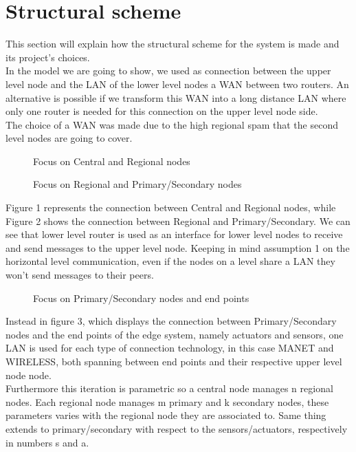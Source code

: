 \documentclass[11pt]{article}
\begin{document}
\section{Structural scheme}
This section will explain how the structural scheme for the system is made and its project's choices.\\
In the model we are going to show, we used as connection between the upper level node and the LAN of the lower level nodes a WAN between two routers. An alternative is possible if we transform this WAN into a long distance LAN where only one router is needed for this connection on the upper level node side.\\
The choice of a WAN was made due to the high regional spam that the second level nodes are going to cover.
\begin{figure}[H]
	\hspace*{-3.75cm}
	\centering
  \frame{}
  \caption{Focus on Central and Regional nodes}
\end{figure}
\begin{figure}[H]
	\hspace*{-3.75cm}
	\frame{}
	\caption{Focus on Regional and Primary/Secondary nodes}
\end{figure}
Figure 1 represents the connection between Central and Regional nodes, while Figure 2 shows the connection between Regional and Primary/Secondary. We can  see that lower level router is used as an interface for lower level nodes to receive and send messages to the upper level node. Keeping in mind assumption 1 on the horizontal level communication, even if the nodes on a level share a LAN they won't send messages to their peers.\\
\begin{figure}[H]
	\hspace*{-3.75cm}
  \frame{}
  \caption{Focus on Primary/Secondary nodes and end points}
\end{figure}
Instead in figure 3, which displays the connection between Primary/Secondary nodes and the end points of the edge system, namely actuators and sensors, one LAN is used for each type of connection technology, in this case MANET and WIRELESS, both spanning between end points and their respective upper level node node.\\
Furthermore this iteration is parametric so a central node manages n regional nodes. Each regional node manages m primary and k secondary nodes, these parameters varies with the regional node they are associated to. Same thing extends to primary/secondary with respect to the sensors/actuators, respectively in numbers s and a.\\
\end{document}
